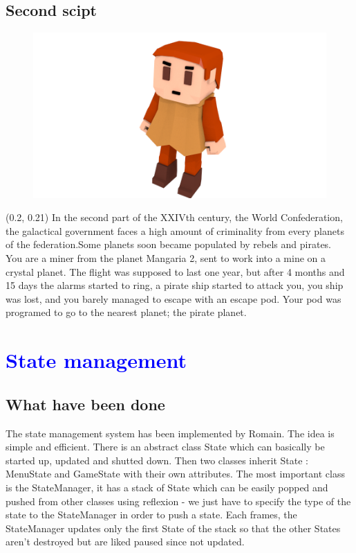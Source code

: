 \documentclass[article]{report} %
\begin{document}
			\section{Second scipt}
				\begin{figure}[h]
				\includegraphics[scale=0.8]{images/Graphics/char.png}
				\end{figure}
				\begin{textblock}{0.22}(0.2, 0.21)
					 In the second part of the XXIVth century, the World Confederation, the galactical government faces a high amount of criminality from every planets of the federation.Some planets soon became populated by rebels and pirates.\\

 You are a miner from the planet Mangaria 2, sent to work into a mine on a crystal planet. The flight was supposed to last one year, but after 4 months and 15 days the alarms started to ring, a pirate ship started to attack you, you ship was lost, and you barely managed to escape with an escape pod. Your pod was programed to go to the nearest planet; the pirate planet.\\
				\end{textblock}


		\chapter{\textcolor{blue}{State management}}
			\section{What have been done}
				The state management system has been implemented by Romain. The idea is simple and efficient. There is an abstract class State which can basically be started up, updated and shutted down. Then two classes inherit State : MenuState and GameState with their own attributes. The most important class is the StateManager, it has a stack of State which can be easily popped and pushed from other classes using reflexion - we just have to specify the type of the state to the StateManager in order to push a state. Each frames, the StateManager updates only the first State of the stack so that the other States aren't destroyed but are liked paused since not updated.\\
\end{document}
